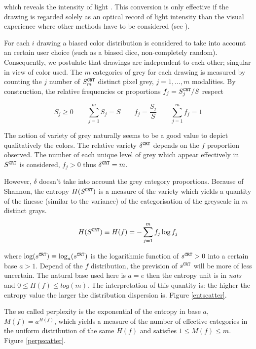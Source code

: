 \documentclass[11pt,a4paper]{article}
\begin{document}
which reveals the intensity of light \cite{poynton1997}. This conversion
is only effective if the drawing is regarded solely as an optical record
of light intensity than the visual experience where other methods have
to be considered (see \cite{amy2005}).

For each \(i\) drawing a biased color distribution is considered to take
into account an certain user choice (such as a biased dice,
non-completely random). Consequently, we postulate that drawings are
independent to each other; singular in view of color used. The \(m\)
categories of grey for each drawing is measured by counting the \(j\)
number of \(S^{\tt \scriptstyle CRT}_m\) distinct pixel grey,
\(j = 1, \dots, m\) modalities. By construction, the relative
frequencies or proportions \(f_j = S^{\tt \scriptstyle CRT}_j/S\)
respect

\[S_j \geq 0 \qquad \sum_{j=1}^{m} S_j = S \qquad f_j = \frac{S_j}{S} \qquad \sum_{j=1}^{m} f_j = 1\]

The notion of variety of grey naturally seems to be a good value to
depict qualitatively the colors. The relative variety
\(\delta^{\tt \scriptstyle CRT}\) depends on the \(f\) proportion
observed. The number of each unique level of grey which appear
effectively in \(S^{\tt \scriptstyle CRT}\) is considered, \(f_j>0\)
thus \(\delta^{\tt \scriptstyle CRT} = m\).

However, \(\delta\) doesn't take into account the grey category
proportions. Because of Shannon, the entropy
\(H(S^{\tt \scriptstyle CRT})\) is a measure of the variety which yields
a quantity of the finesse (similar to the variance) of the
categorisation of the greyscale in \(m\) distinct grays.

\[ H(S^{\tt \scriptstyle CRT}) \equiv H(f) = -\sum_{j=1}^{m} f_j \log f_j \]

where
\(\log(s^{\tt \scriptstyle CRT}) \equiv \log_a(s^{\tt \scriptstyle CRT})\)
is the logarithmic function of \(s^{\tt \scriptstyle CRT} > 0\) into a
certain base \(a > 1\). Depend of the \(f\) distribution, the prevision
of \(s^{\tt \scriptstyle CRT}\) will be more of less uncertain. The
natural base used here is \(a = e\) then the entropy unit is in
\emph{nats} and \(0 \leq H(f) \leq log(m)\). The interpretation of this
quantity is: the higher the entropy value the larger the distribution
dispersion is. Figure \ref{entscatter}.

The so called perplexity is the exponential of the entropy in base
\(a\), \(M(f) = a^{H(f)}\), which yields a measure of the number of
effective categories in the uniform distribution of the same \(H(f)\)
and satisfies \(1 \leq M(f) \leq m\). Figure \ref{perpscatter}.
\end{document}
